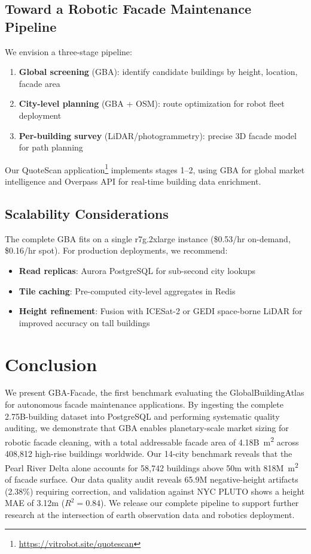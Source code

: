 \documentclass[10pt,twocolumn]{article}
\begin{document}
\subsection{Toward a Robotic Facade Maintenance Pipeline}

We envision a three-stage pipeline:
\begin{enumerate}
  \item \textbf{Global screening} (GBA): identify candidate buildings by height, location, facade area
  \item \textbf{City-level planning} (GBA + OSM): route optimization for robot fleet deployment
  \item \textbf{Per-building survey} (LiDAR/photogrammetry): precise 3D facade model for path planning
\end{enumerate}

Our QuoteScan application\footnote{\url{https://vitrobot.site/quotescan}} implements stages 1--2, using GBA for global market intelligence and Overpass API for real-time building data enrichment.

\subsection{Scalability Considerations}

The complete GBA fits on a single r7g.2xlarge instance (\$0.53/hr on-demand, \$0.16/hr spot). For production deployments, we recommend:
\begin{itemize}
  \item \textbf{Read replicas}: Aurora PostgreSQL for sub-second city lookups
  \item \textbf{Tile caching}: Pre-computed city-level aggregates in Redis
  \item \textbf{Height refinement}: Fusion with ICESat-2 or GEDI space-borne LiDAR for improved accuracy on tall buildings
\end{itemize}

\section{Conclusion}
\label{sec:conclusion}

We present GBA-Facade, the first benchmark evaluating the GlobalBuildingAtlas for autonomous facade maintenance applications. By ingesting the complete 2.75B-building dataset into PostgreSQL and performing systematic quality auditing, we demonstrate that GBA enables planetary-scale market sizing for robotic facade cleaning, with a total addressable facade area of 4.18B~m\textsuperscript{2} across 408,812 high-rise buildings worldwide. Our 14-city benchmark reveals that the Pearl River Delta alone accounts for 58,742 buildings above 50m with 818M~m\textsuperscript{2} of facade surface. Our data quality audit reveals 65.9M negative-height artifacts (2.38\%) requiring correction, and validation against NYC PLUTO shows a height MAE of 3.12m ($R^2 = 0.84$). We release our complete pipeline to support further research at the intersection of earth observation data and robotics deployment.
\end{document}
